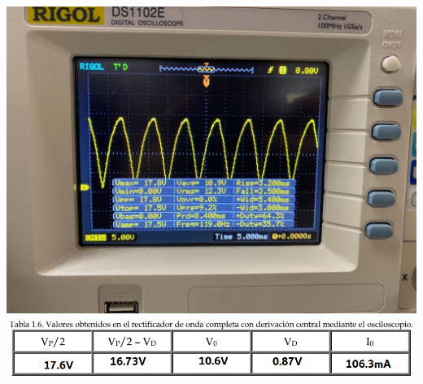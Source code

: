 \documentclass[12pt]{article}
\begin{document}
\begin{enumerate}
\begin{enumerate}
\begin{center}
                    \includegraphics*[scale=0.27]{img1-91.jpg}
                    \includegraphics*[scale=0.57]{tabla1-6.png}
                \end{center}
            

\end{enumerate}
\end{enumerate}
\end{document}
